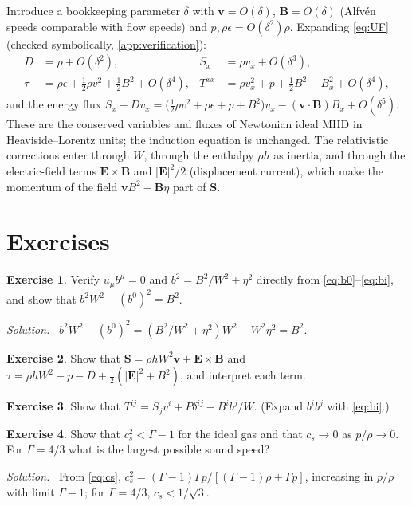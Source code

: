 \documentclass[11pt,a4paper,oneside,openany]{book}
\theoremstyle{definition}
\newtheorem{exercise}{Exercise}[chapter]
\theoremstyle{plain}
\theoremstyle{remark}
\newenvironment{solution}{\par\smallskip\noindent\small\textit{Solution.}\ }{\par\medskip}
\newcommand{\vv}{\bm{v}}
\newcommand{\BB}{\bm{B}}
\newcommand{\EE}{\bm{E}}
\newcommand{\SSS}{\bm{S}}
\newcommand{\Ptot}{P}
\newcommand{\vB}{\eta}
\begin{document}
Introduce a bookkeeping parameter $\delta$ with $\vv=O(\delta)$, $\BB=O(\delta)$ (Alfvén
speeds comparable with flow speeds) and $p,\rho\epsilon=O(\delta^2)\rho$. Expanding
\eqref{eq:UF} (checked symbolically, \cref{app:verification}):
\begin{align}
D&=\rho+O(\delta^2), & S_x&=\rho v_x+O(\delta^3),\\
\tau&=\rho\epsilon+\tfrac12\rho v^2+\tfrac12B^2+O(\delta^4), &
T^{xx}&=\rho v_x^2+p+\tfrac12B^2-B_x^2+O(\delta^4),
\end{align}
and the energy flux $S_x-Dv_x=\bigl(\tfrac12\rho v^2+\rho\epsilon+p+B^2\bigr)v_x-(\vv\cdot\BB)B_x
+O(\delta^5)$. These are the conserved variables and fluxes of Newtonian ideal MHD in
Heaviside--Lorentz units; the induction equation is unchanged. The relativistic
corrections enter through $W$, through the enthalpy $\rho h$ as inertia, and through the
electric-field terms $\EE\times\BB$ and $|\EE|^2/2$ (displacement current), which make the
momentum of the field $\vv B^2-\BB\vB$ part of $\SSS$.

\section*{Exercises}

\begin{exercise}
Verify $u_\mu b^\mu=0$ and $b^2=B^2/W^2+\vB^2$ directly from \eqref{eq:b0}--\eqref{eq:bi},
and show that $b^2W^2-(b^0)^2=B^2$.
\end{exercise}
\begin{solution}
$b^2W^2-(b^0)^2=(B^2/W^2+\vB^2)W^2-W^2\vB^2=B^2$.
\end{solution}

\begin{exercise}
Show that $\SSS=\rho hW^2\vv+\EE\times\BB$ and $\tau=\rho hW^2-p-D+\frac12(|\EE|^2+B^2)$, and
interpret each term.
\end{exercise}

\begin{exercise}
Show that $T^{ij}=S_jv^i+\Ptot\delta^{ij}-B^ib^j/W$. (Expand $b^ib^j$ with
\eqref{eq:bi}.)
\end{exercise}

\begin{exercise}
Show that $c_s^2<\Gamma-1$ for the ideal gas and that $c_s\to0$ as $p/\rho\to0$. For
$\Gamma=4/3$ what is the largest possible sound speed?
\end{exercise}
\begin{solution}
From \eqref{eq:cs}, $c_s^2=(\Gamma-1)\Gamma p/[(\Gamma-1)\rho+\Gamma p]$, increasing in
$p/\rho$ with limit $\Gamma-1$; for $\Gamma=4/3$, $c_s<1/\sqrt3$.
\end{solution}
\end{document}
